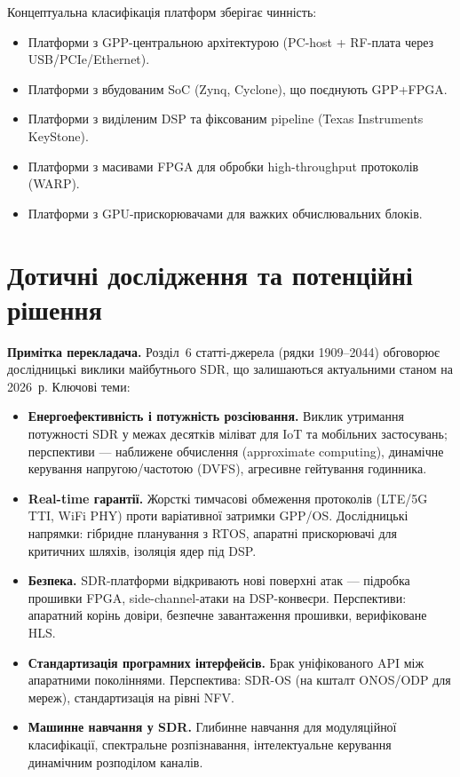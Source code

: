 \documentclass[journal]{IEEEtran}
\begin{document}
Концептуальна класифікація платформ зберігає чинність:
\begin{itemize}
\item Платформи з GPP-центральною архітектурою (PC-host + RF-плата через USB/PCIe/Ethernet).
\item Платформи з вбудованим SoC (Zynq, Cyclone), що поєднують GPP+FPGA.
\item Платформи з виділеним DSP та фіксованим pipeline (Texas Instruments KeyStone).
\item Платформи з масивами FPGA для обробки high-throughput протоколів (WARP).
\item Платформи з GPU-прискорювачами для важких обчислювальних блоків.
\end{itemize}


\section{Дотичні дослідження та потенційні рішення}
\label{related}

\textbf{Примітка перекладача.} Розділ~6 статті-джерела (рядки 1909--2044) обговорює дослідницькі виклики майбутнього SDR, що залишаються актуальними станом на 2026~р. Ключові теми:

\begin{itemize}
\item \textbf{Енергоефективність і потужність розсіювання.} Виклик утримання потужності SDR у межах десятків міліват для IoT та мобільних застосувань; перспективи — наближене обчислення (approximate computing), динамічне керування напругою/частотою (DVFS), агресивне гейтування годинника.
\item \textbf{Real-time гарантії.} Жорсткі тимчасові обмеження протоколів (LTE/5G TTI, WiFi PHY) проти варіативної затримки GPP/OS. Дослідницькі напрямки: гібридне планування з RTOS, апаратні прискорювачі для критичних шляхів, ізоляція ядер під DSP.
\item \textbf{Безпека.} SDR-платформи відкривають нові поверхні атак — підробка прошивки FPGA, side-channel-атаки на DSP-конвеєри. Перспективи: апаратний корінь довіри, безпечне завантаження прошивки, верифіковане HLS.
\item \textbf{Стандартизація програмних інтерфейсів.} Брак уніфікованого API між апаратними поколіннями. Перспектива: SDR-OS (на кшталт ONOS/ODP для мереж), стандартизація на рівні NFV.
\item \textbf{Машинне навчання у SDR.} Глибинне навчання для модуляційної класифікації, спектральне розпізнавання, інтелектуальне керування динамічним розподілом каналів.
\end{itemize}
\end{document}
